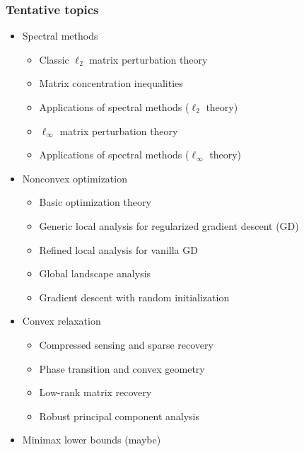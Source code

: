 \documentclass[compress,
mathserif,wide,%
]{beamer}
\begin{document}
\begin{frame}
\frametitle{Tentative topics}

\begin{itemize}
  \item Spectral methods
    \begin{itemize}
      \item Classic $\ell_2$ matrix perturbation theory
      \item Matrix concentration inequalities
      \item Applications of spectral methods ($\ell_2$ theory)
      \item $\ell_{\infty}$ matrix perturbation theory
      \item Applications of spectral methods ($\ell_{\infty}$ theory)
    \end{itemize}
  \item Nonconvex optimization
    \begin{itemize}
      \item Basic optimization theory
      \item Generic local analysis for regularized gradient descent (GD)
      \item Refined local analysis for vanilla GD
      \item Global landscape analysis
      \item Gradient descent with random initialization
    \end{itemize}
  \item Convex relaxation
    \begin{itemize}
      \item Compressed sensing and sparse recovery
      \item Phase transition and convex geometry
      \item Low-rank matrix recovery
      \item Robust principal component analysis
    \end{itemize}
   \item Minimax lower bounds (maybe)
\end{itemize}

\end{frame}
\end{document}
